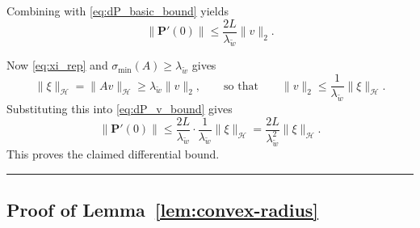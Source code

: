 \documentclass[twoside,11pt]{article}
\newcommand{\BlackBoxProof}{\rule{1.5ex}{1.5ex}}
\renewenvironment{proof}{\par\noindent{\bf Proof\ }}{\hfill\BlackBoxProof\par\medskip}
\renewcommand{\P}{\mathbf{P}}
\begin{document}
\begin{proof}
Combining with \eqref{eq:dP_basic_bound} yields
\begin{equation}\label{eq:dP_v_bound}
\|\P'(0)\|\le \frac{2L}{\lambda_{\tilde w}} \|v\|_2.
\end{equation}

Now \eqref{eq:xi_rep} and $\sigma_{\min}(A)\ge \lambda_{\tilde w}$ gives
\[
\|\xi\|_{\mathcal H}=\|A v\|_{\mathcal H}\ge \lambda_{\tilde w} \|v\|_2,
\qquad\text{so that}\qquad
\|v\|_2\le \frac{1}{\lambda_{\tilde w}}\|\xi\|_{\mathcal H}.
\]
Substituting this into \eqref{eq:dP_v_bound} gives
\[
\|\P'(0)\|
\le \frac{2L}{\lambda_{\tilde w}}\cdot \frac{1}{\lambda_{\tilde w}}\|\xi\|_{\mathcal H}
= \frac{2L}{\lambda_{\tilde w}^2} \|\xi\|_{\mathcal H}.
\]
This proves the claimed differential bound.
\end{proof}


\subsection{Proof of Lemma~\ref{lem:convex-radius}}\label{app:proof-convex-radius}
\end{document}
